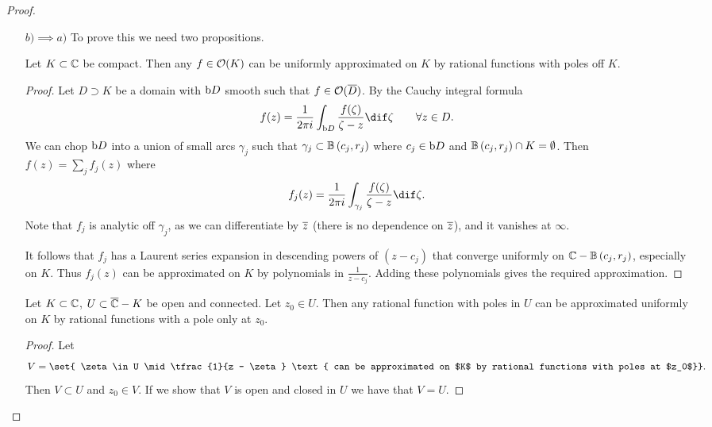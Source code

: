 \begin{proof}
\begin{itemize}
        \item[$\boxed{b) \implies a)}$] To prove this we need two propositions.
        \begin{proposition}
            Let $K \subset \mathbb{C}$ be compact. Then any $f \in \mathcal{O}(K)$ can be uniformly approximated on $K $ by rational functions with poles off $K$.
        \end{proposition}
        \begin{proof}
            Let $D \supset K$ be a domain with $\operatorname{b}\! D $ smooth such that $f \in \mathcal{O}(\overline{D})$. By the Cauchy integral formula
            \begin{align*}
                f(z) = \frac{1}{2 \pi i} \int_{\bdy D} \frac{f(\zeta) }{\zeta - z} \dif \zeta \qquad \forall z \in D.
            \end{align*}
            We can chop $\operatorname{b}\! D$ into a union of small arcs $\gamma_j$ such that $\gamma_j \subset \ball{c_j}{r_j}$ where $c_j \in \operatorname{b}\! D$ and $\ball{c_j}{r_j} \cap K = \emptyset$. Then $f(z) = \sum_j f_j(z) $ where
            \begin{align*}
                f_j(z) = \frac{1}{2 \pi i} \int_{\gamma_j} \frac{f(\zeta) }{\zeta - z} \dif \zeta.
            \end{align*}
            Note that $f_j$ is analytic off $\gamma_j$, as we can differentiate by $\overline{z}$ (there is no dependence on $\overline{z}$), and it vanishes at $\infty$.

            It follows that $f_j$ has a Laurent series expansion in descending powers of $(z-c_j)$ that converge uniformly on $\C - \ball{c_j}{r_j}$, especially on $K$. Thus $f_j(z)$ can be approximated on $K$ by polynomials in $\frac{1}{z-c_j}$. Adding these polynomials gives the required approximation.
        \end{proof}

        \begin{proposition}
            Let $K \subset \mathbb{C}$, $U \subset \overline{\mathbb{C}} - K$ be open and connected. Let $z_0 \in U$. Then any rational function with poles in $U$ can be approximated uniformly on $K$ by rational functions with a pole only at $z_0$.
        \end{proposition}

        \begin{proof}
            Let
            \begin{align*}
                V = \set{ \zeta \in U \mid \tfrac{1}{z - \zeta } \text{ can be approximated on $K$ by rational functions with poles at $z_0$}}.
            \end{align*}
            Then $V \subset U$ and $z_0 \in V$. If we show that $V$ is open and closed in $U$ we have that $V = U$. 
            

\end{proof}
\end{itemize}
\end{proof}
